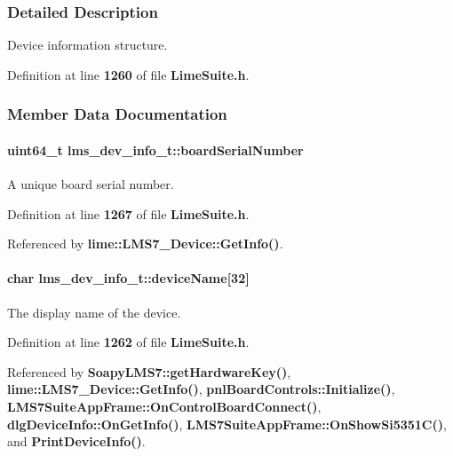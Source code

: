 \subsubsection{Detailed Description}
Device information structure. 

Definition at line {\bf 1260} of file {\bf Lime\+Suite.\+h}.



\subsubsection{Member Data Documentation}
\paragraph[{board\+Serial\+Number}]{\setlength{\rightskip}{0pt plus 5cm}uint64\+\_\+t lms\+\_\+dev\+\_\+info\+\_\+t\+::board\+Serial\+Number}\label{structlms__dev__info__t_aad3ed39976ec74a0bc189dbae31afd2e}


A unique board serial number. 



Definition at line {\bf 1267} of file {\bf Lime\+Suite.\+h}.



Referenced by {\bf lime\+::\+L\+M\+S7\+\_\+\+Device\+::\+Get\+Info()}.

\paragraph[{device\+Name}]{\setlength{\rightskip}{0pt plus 5cm}char lms\+\_\+dev\+\_\+info\+\_\+t\+::device\+Name[32]}\label{structlms__dev__info__t_a59ee4a414162ec74cd3816d2245353f7}


The display name of the device. 



Definition at line {\bf 1262} of file {\bf Lime\+Suite.\+h}.



Referenced by {\bf Soapy\+L\+M\+S7\+::get\+Hardware\+Key()}, {\bf lime\+::\+L\+M\+S7\+\_\+\+Device\+::\+Get\+Info()}, {\bf pnl\+Board\+Controls\+::\+Initialize()}, {\bf L\+M\+S7\+Suite\+App\+Frame\+::\+On\+Control\+Board\+Connect()}, {\bf dlg\+Device\+Info\+::\+On\+Get\+Info()}, {\bf L\+M\+S7\+Suite\+App\+Frame\+::\+On\+Show\+Si5351\+C()}, and {\bf Print\+Device\+Info()}.

